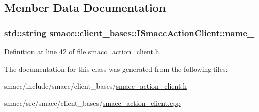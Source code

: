 \subsection{Member Data Documentation}
\subsubsection[{\texorpdfstring{name\+\_\+}{name_}}]{\setlength{\rightskip}{0pt plus 5cm}std\+::string smacc\+::client\+\_\+bases\+::\+I\+Smacc\+Action\+Client\+::name\+\_\+\hspace{0.3cm}{\ttfamily [protected]}}\hypertarget{classsmacc_1_1client__bases_1_1ISmaccActionClient_a74c660a4c111a3b8858b9b7b1cedc866}{}\label{classsmacc_1_1client__bases_1_1ISmaccActionClient_a74c660a4c111a3b8858b9b7b1cedc866}


Definition at line 42 of file smacc\+\_\+action\+\_\+client.\+h.



The documentation for this class was generated from the following files\+:\begin{DoxyCompactItemize}
\item 
smacc/include/smacc/client\+\_\+bases/\hyperlink{smacc__action__client_8h}{smacc\+\_\+action\+\_\+client.\+h}\item 
smacc/src/smacc/client\+\_\+bases/\hyperlink{smacc__action__client_8cpp}{smacc\+\_\+action\+\_\+client.\+cpp}\end{DoxyCompactItemize}
